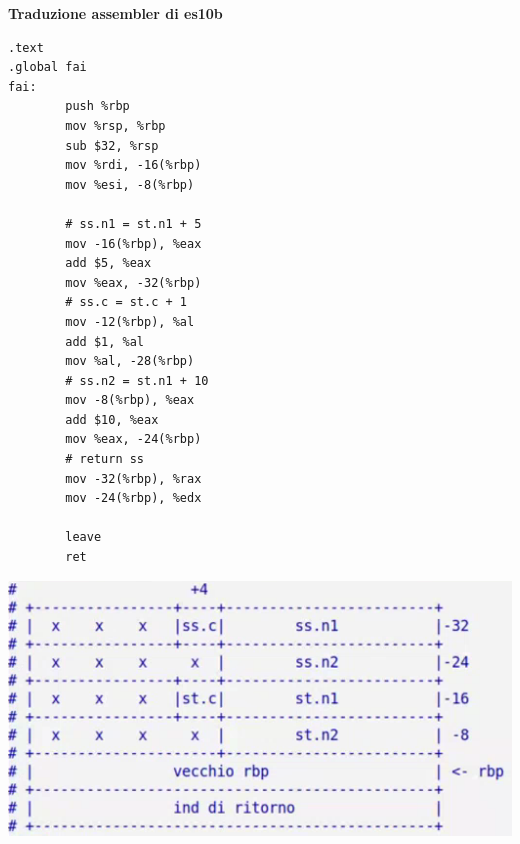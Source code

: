 \documentclass[11pt]{report}
\theoremstyle{definition}
\begin{document}
\noindent \textbf{Traduzione assembler di es10b}
\begin{verbatim}
.text
.global fai
fai:
        push %rbp
        mov %rsp, %rbp
        sub $32, %rsp
        mov %rdi, -16(%rbp)
        mov %esi, -8(%rbp)
        
        # ss.n1 = st.n1 + 5
        mov -16(%rbp), %eax
        add $5, %eax
        mov %eax, -32(%rbp)
        # ss.c = st.c + 1
        mov -12(%rbp), %al
        add $1, %al
        mov %al, -28(%rbp)
        # ss.n2 = st.n1 + 10
        mov -8(%rbp), %eax
        add $10, %eax
        mov %eax, -24(%rbp)
        # return ss
        mov -32(%rbp), %rax
        mov -24(%rbp), %edx
        
        leave
        ret
\end{verbatim}
\begin{center}
\includegraphics[scale=.9]{img/31.PNG}
\end{center} 
\end{document}
